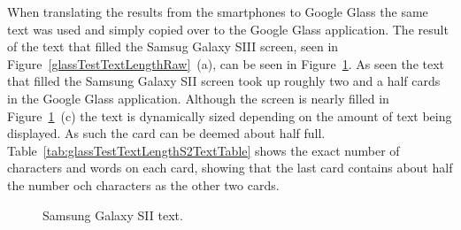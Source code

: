 When translating the results from the smartphones to Google Glass the same text was used and simply copied over to the Google Glass application. The result of the text that filled the Samsug Galaxy SIII screen, seen in Figure~\ref{glassTestTextLengthRaw}~(a), can be seen in Figure~\ref{glassTestTextLengthS2Text}. As seen the text that filled the Samsung Galaxy SII screen took up roughly two and a half cards in the Google Glass application. Although the screen is nearly filled in Figure~\ref{glassTestTextLengthS2Text}~(c) the text is dynamically sized depending on the amount of text being displayed. As such the card can be deemed about half full. Table~\ref{tab:glassTestTextLengthS2TextTable} shows the exact number of characters and words on each card, showing that the last card contains about half the number och characters as the other two cards.

	\begin{figure}[H]%
		\centering
   		 \qquad
   		 \qquad
   		 \qquad
		\caption{Samsung Galaxy SII text.}
		\label{glassTestTextLengthS2Text}
	\end{figure}

